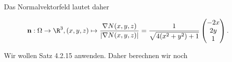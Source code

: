\begin{solution}
\begin{enumerate}[label = \arabic*.]
    Das Normalvektorfeld lautet daher
    
    \begin{align*}
        \mathbf n:
            \Omega \to \R^3,
            (x, y, z)
            \mapsto
            \frac
            {
                \nabla N(x, y, z)
            }{
                |\nabla N(x, y, z)|
            }
            =
            \frac{1}{\sqrt{4 (x^2 + y^2) + 1}}
            \begin{pmatrix}
                -2 x \\ 2 y \\ 1
            \end{pmatrix}.
    \end{align*}

    Wir wollen Satz 4.2.15 anwenden.
    Daher berechnen wir noch


\end{enumerate}
\end{solution}

